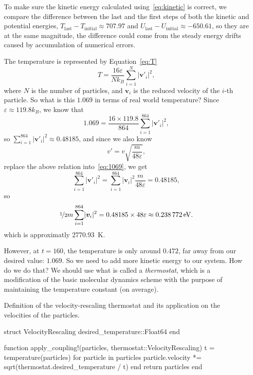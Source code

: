 To make sure the kinetic energy calculated using~\eqref{eq:kinetic} is correct, we compare
the difference between the last and the first steps of both the kinetic and potential
energies, \(T_\text{last} - T_\text{initial} \approx 707.97\) and
\(U_\text{last} - U_\text{initial} \approx -650.61\), so they are at the same magnitude,
the difference could come from the steady energy drifts caused by accumulation of
numerical errors.

The temperature is represented by Equation~\eqref{eq:T}
%
\begin{equation}\label{eq:T}
    T = \frac{ 16\varepsilon }{ N k_B } \sum_{i=1}^{N} \lvert \bm{v}'_i \rvert^2,
\end{equation}
%
where \(N\) is the number of particles, and \(\bm{v}_i\) is the reduced velocity of the \(i\)-th particle.
So what is this \(1.069\) in terms of real world temperature?
Since \(\varepsilon \approx 119.8 k_B\), we know that
%
\begin{equation}\label{eq:1069}
    1.069 = \frac{ 16 \times 119.8 }{ 864 } \sum_{i=1}^{864} \lvert \bm{v}'_i \rvert^2,
\end{equation}
%
so \(\sum_{i=1}^{864} \lvert \bm{v}'_i \rvert^2 \approx 0.48185 \), and since we also know
%
\begin{equation}
    v' = v \sqrt{ \frac{ m }{ 48\varepsilon } },
\end{equation}
%
replace the above relation into~\eqref{eq:1069}, we get
%
\begin{equation}
    \sum_{i=1}^{864} \lvert \bm{v}'_i \rvert^2 = \sum_{i=1}^{864} \lvert \bm{v}_i \rvert^2 \frac{m}{48\varepsilon}
    = 0.48185,
\end{equation}
%
so
%
\begin{equation}
    \nicefrac{1}{2} m\sum_{i=1}^{864} \lvert \bm{v}_i \rvert^2 = 0.48185 \times 48\varepsilon \approx \qty{0.238772}{\electronvolt}.
\end{equation}
%
which is approximatly \qty{2770.93}{\kelvin}.

However, at \(t = 160\), the temperature is only around \(0.472\), far away from our desired
value: \(1.069\). So we need to add more kinetic energy to our system. How do we do that?
We should use what is called a \emph{thermostat}, which is
a modiﬁcation of the basic molecular dynamics scheme with the purpose of maintaining the
temperature constant (on average).

\begin{algorithm}[H]
    \caption{Definition of the velocity-rescaling thermostat and its application
        on the velocities of the particles.}
    \label{lst:thermostat}
    \begin{juliacode}
        struct VelocityRescaling
            desired_temperature::Float64
        end

        function apply_coupling!(particles, thermostat::VelocityRescaling)
            t = temperature(particles)
            for particle in particles
                particle.velocity *= sqrt(thermostat.desired_temperature / t)
            end
            return particles
        end
    \end{juliacode}
\end{algorithm}


